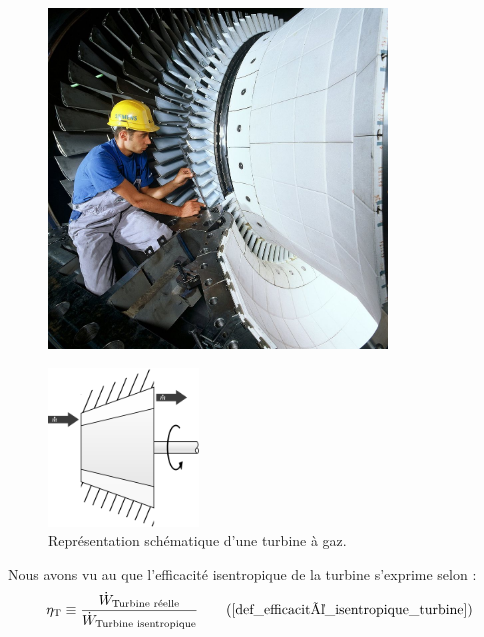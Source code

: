 		\begin{figure}
			\begin{center}
				\includegraphics[width=9cm]{images/photo_turbine.jpg}\hspace{0.2cm}
			\end{center}
			\label{fig_illustration_turbine1}
		\end{figure}

		\begin{figure}
			\begin{center}
				\includegraphics[width=4cm]{images/symbole_turbine.png}
			\end{center}
			\caption{Représentation schématique d’une turbine à gaz.}
			\label{fig_illustration_turbine2}
		\end{figure}



		Nous avons vu au \coursneuf que l’efficacité isentropique de la turbine s’exprime selon :
		\begin{equation}
			\eta_\text{T} \equiv  \frac{\dot{W}_\text{Turbine réelle}}{\dot{W}_\text{Turbine isentropique}}	  \tag{\ref{def_efficacité_isentropique_turbine}}
		\end{equation}

